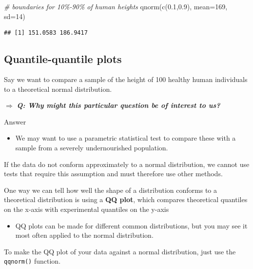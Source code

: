 \documentclass[
]{article}
\newenvironment{Shaded}{\begin{snugshade}}{\end{snugshade}}
\newcommand{\AttributeTok}[1]{\textcolor[rgb]{0.77,0.63,0.00}{#1}}
\newcommand{\CommentTok}[1]{\textcolor[rgb]{0.56,0.35,0.01}{\textit{#1}}}
\newcommand{\DecValTok}[1]{\textcolor[rgb]{0.00,0.00,0.81}{#1}}
\newcommand{\FloatTok}[1]{\textcolor[rgb]{0.00,0.00,0.81}{#1}}
\newcommand{\FunctionTok}[1]{\textcolor[rgb]{0.00,0.00,0.00}{#1}}
\newcommand{\NormalTok}[1]{#1}
\providecommand{\tightlist}{%
  \setlength{\itemsep}{0pt}\setlength{\parskip}{0pt}}
\begin{document}
\begin{Shaded}
\begin{Highlighting}[]
\CommentTok{\# boundaries for 10\%{-}90\% of human heights}
\FunctionTok{qnorm}\NormalTok{(}\FunctionTok{c}\NormalTok{(}\FloatTok{0.1}\NormalTok{,}\FloatTok{0.9}\NormalTok{), }\AttributeTok{mean=}\DecValTok{169}\NormalTok{, }\AttributeTok{sd=}\DecValTok{14}\NormalTok{)}
\end{Highlighting}
\end{Shaded}

\begin{verbatim}
## [1] 151.0583 186.9417
\end{verbatim}

\hypertarget{quantile-quantile-plots}{%
\subsection{Quantile-quantile plots}\label{quantile-quantile-plots}}

Say we want to compare a sample of the height of 100 healthy human
individuals to a theoretical normal distribution.

\(\Rightarrow\) \textbf{\emph{Q: Why might this particular question be
of interest to us?}}

Answer

\begin{itemize}
\tightlist
\item
  We may want to use a parametric statistical test to compare these with
  a sample from a severely undernourished population.
\end{itemize}

If the data do not conform approximately to a normal distribution, we
cannot use tests that require this assumption and must therefore use
other methods.

One way we can tell how well the shape of a distribution conforms to a
theoretical distribution is using a \textbf{QQ plot}, which compares
theoretical quantiles on the x-axis with experimental quantiles on the
y-axis

\begin{itemize}
\tightlist
\item
  QQ plots can be made for different common distributions, but you may
  see it most often applied to the normal distribution.
\end{itemize}

To make the QQ plot of your data against a normal distribution, just use
the \texttt{qqnorm()} function.
\end{document}

